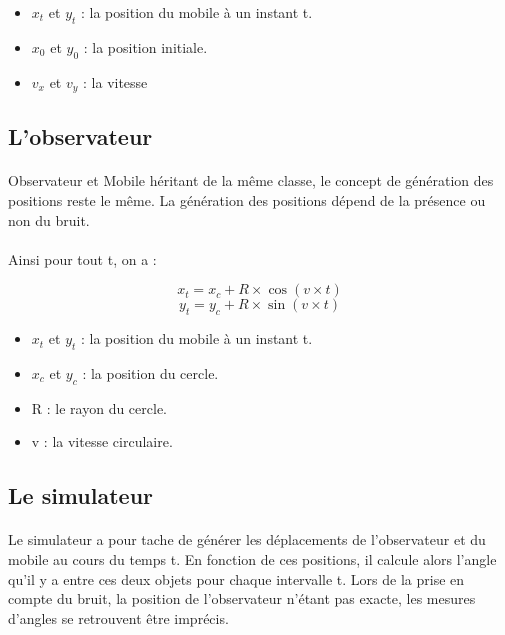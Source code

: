 \documentclass[a4paper,11pt]{article}
\begin{document}
 		\begin{itemize}
			\item $x_{t}$ et $y_{t}$ : la position du mobile à un instant t.
			\item $x_{0}$ et $y_{0}$ : la position initiale.
			\item $v_{x}$ et $v_{y}$ : la vitesse
		\end{itemize}

		\newpage

		\subsection{L'observateur}
		\paragraph{}
		Observateur et Mobile héritant de la même classe, le concept de génération des positions reste le même. La génération des positions dépend de la présence ou non du bruit.
		
		\paragraph{}
		Ainsi pour tout t, on a :
		
			\begin{equation} 
				x_{t} = x_{c} + R \times \cos( v \times t) 
			\end{equation}
			\begin{equation} 
				y_{t} = y_{c} + R \times \sin( v \times t) 
			\end{equation}

 		\begin{itemize}
			\item $x_{t}$ et $y_{t}$ : la position du mobile à un instant t.
			\item $x_{c}$ et $y_{c}$ : la position du cercle.
			\item R : le rayon du cercle.
			\item v : la vitesse circulaire.
		\end{itemize}
		


		\subsection{Le simulateur}
		\paragraph{}
		Le simulateur a pour tache de générer les déplacements de l'observateur et du mobile au cours du temps t. En fonction de ces positions, il calcule alors l'angle qu'il y a entre ces deux objets pour chaque intervalle t. Lors de la prise en compte du bruit, la position de l'observateur n'étant pas exacte, les mesures d'angles se retrouvent être imprécis.
\end{document}
